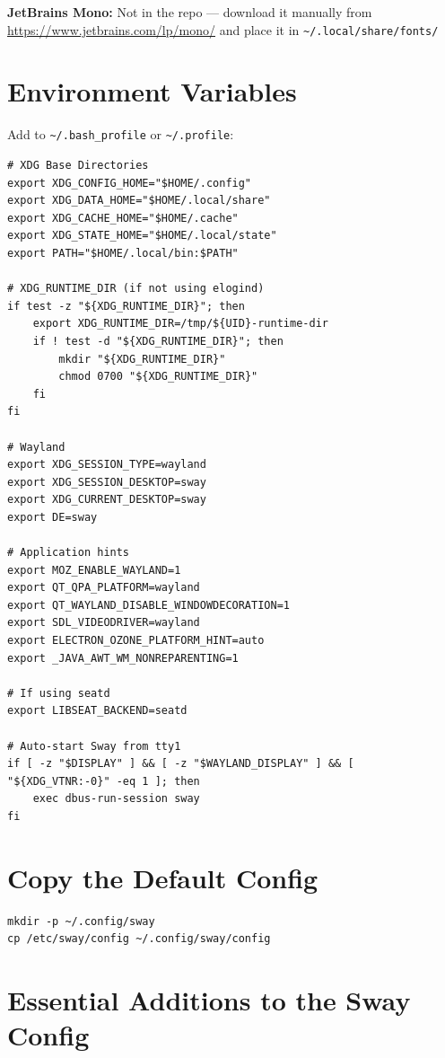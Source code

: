 \documentclass[12pt, a4paper]{book}
\begin{document}
\begin{notebox}
\textbf{JetBrains Mono:} Not in the repo --- download it manually from \url{https://www.jetbrains.com/lp/mono/} and place it in \texttt{\textasciitilde/.local/share/fonts/}
\end{notebox}

\section{Environment Variables}

Add to \texttt{\textasciitilde/.bash\_profile} or \texttt{\textasciitilde/.profile}:

\begin{lstlisting}
# XDG Base Directories
export XDG_CONFIG_HOME="$HOME/.config"
export XDG_DATA_HOME="$HOME/.local/share"
export XDG_CACHE_HOME="$HOME/.cache"
export XDG_STATE_HOME="$HOME/.local/state"
export PATH="$HOME/.local/bin:$PATH"

# XDG_RUNTIME_DIR (if not using elogind)
if test -z "${XDG_RUNTIME_DIR}"; then
    export XDG_RUNTIME_DIR=/tmp/${UID}-runtime-dir
    if ! test -d "${XDG_RUNTIME_DIR}"; then
        mkdir "${XDG_RUNTIME_DIR}"
        chmod 0700 "${XDG_RUNTIME_DIR}"
    fi
fi

# Wayland
export XDG_SESSION_TYPE=wayland
export XDG_SESSION_DESKTOP=sway
export XDG_CURRENT_DESKTOP=sway
export DE=sway

# Application hints
export MOZ_ENABLE_WAYLAND=1
export QT_QPA_PLATFORM=wayland
export QT_WAYLAND_DISABLE_WINDOWDECORATION=1
export SDL_VIDEODRIVER=wayland
export ELECTRON_OZONE_PLATFORM_HINT=auto
export _JAVA_AWT_WM_NONREPARENTING=1

# If using seatd
export LIBSEAT_BACKEND=seatd

# Auto-start Sway from tty1
if [ -z "$DISPLAY" ] && [ -z "$WAYLAND_DISPLAY" ] && [ "${XDG_VTNR:-0}" -eq 1 ]; then
    exec dbus-run-session sway
fi
\end{lstlisting}

\section{Copy the Default Config}
\begin{lstlisting}
mkdir -p ~/.config/sway
cp /etc/sway/config ~/.config/sway/config
\end{lstlisting}

\section{Essential Additions to the Sway Config}
\end{document}
